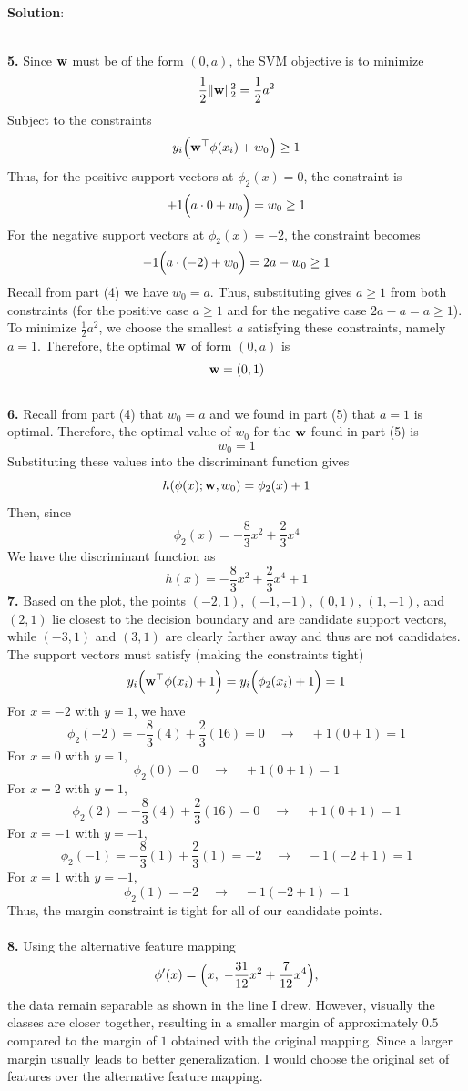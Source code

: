 \documentclass[submit]{../harvardml}
\newenvironment{solution}{
    \vspace{2mm}
    \color{blue}\noindent\textbf{Solution}:
}{}
\begin{document}
\begin{solution}
\\
\textbf{5.} Since $\mathbf{w}$ must be of the form $(0,a)$, the SVM objective is to minimize 
$$\frac{1}{2}\|\mathbf{w}\|_2^2 = \frac{1}{2}a^2$$  
Subject to the constraints 
$$y_i\Bigl(\mathbf{w}^\top\mathbf{\phi}(x_i) +w_0\Bigr) \ge 1$$
Thus, for the positive support vectors at $\phi_2(x)=0$, the constraint is  
$$+1\Bigl(a\cdot 0+w_0\Bigr)=w_0\ge 1$$  
For the negative support vectors at $\phi_2(x)=-2$, the constraint becomes  
$$-1\Bigl(a\cdot (-2)+w_0\Bigr)=2a-w_0\ge 1$$  
Recall from part (4) we have $w_0=a$. Thus, substituting gives $a\ge 1$ from both constraints (for the positive case $a\ge1$ and for the negative case $2a-a = a\ge1$). To minimize $\frac{1}{2}a^2$, we choose the smallest $a$ satisfying these constraints, namely $a=1$. Therefore, the optimal $\mathbf{w}$ of form $(0,a)$ is
$$\mathbf{w}=(0,1)$$
\\
\textbf{6.} Recall from part (4) that $w_0 = a$ and we found in part (5) that $a=1$ is optimal. Therefore, the optimal value of $w_0$ for the $\mathbf{w}$ found in part (5) is
$$w_0 = 1$$
Substituting these values into the discriminant function gives  
$$h(\mathbf{\phi}(x);\mathbf{w},w_0)=\phi_2(x)+1$$  
Then, since  
$$\phi_2(x)=-\frac{8}{3}x^2+\frac{2}{3}x^4$$  
We have  the discriminant function as
$$h(x)=-\frac{8}{3}x^2+\frac{2}{3}x^4+1$$
\textbf{7.} Based on the plot, the points $(-2,1)$, $(-1,-1)$, $(0,1)$, $(1,-1)$, and $(2,1)$ lie closest to the decision boundary and are candidate support vectors, while $(-3,1)$ and $(3,1)$ are clearly farther away and thus are not candidates. The support vectors must satisfy (making the constraints tight)
$$y_i\Bigl(\mathbf{w} ^\top\phi(x_i)+1\Bigr)= y_i\Bigl(\phi_2(x_i)+1\Bigr)=1$$  
For $x = -2$ with $y = 1$, we have 
$$\phi_2(-2) = -\frac{8}{3}(4) + \frac{2}{3}(16) = 0 \quad \longrightarrow \quad +1(0+1)=1$$ 
For $x = 0$ with $y = 1$, 
$$\phi_2(0)= 0 \quad \longrightarrow \quad +1(0+1)=1$$ 
For $x = 2$ with $y = 1$, 
$$\phi_2(2)= -\frac{8}{3}(4) + \frac{2}{3}(16) = 0 \quad \longrightarrow \quad +1(0+1)=1$$ 
For $x = -1$ with $y = -1$, 
$$\phi_2(-1) = -\frac{8}{3}(1) + \frac{2}{3}(1) = -2 \quad \longrightarrow \quad -1(-2+1)=1$$ 
For $x = 1$ with $y = -1$, 
$$\phi_2(1) = -2 \quad \longrightarrow \quad -1(-2+1)=1$$ 
Thus, the margin constraint is tight for all of our candidate points.
\\
\\
\textbf{8.}  Using the alternative feature mapping 
$$
\mathbf{\phi}'(x)=\Bigl(x,\; -\frac{31}{12}x^2+\frac{7}{12}x^4\Bigr),
$$ 
the data remain separable as shown in the line I drew. However, visually the classes are closer together, resulting in a smaller margin of approximately $0.5$ compared to the margin of $1$ obtained with the original mapping. Since a larger margin usually leads to better generalization, I would choose the original set of features over the alternative feature mapping.

\end{solution}
\end{document}
